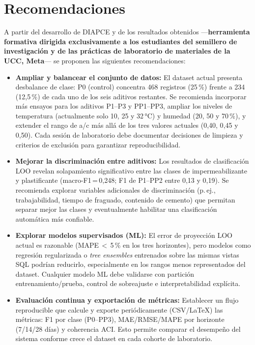 \section{Recomendaciones}

A partir del desarrollo de DIAPCE y de los resultados obtenidos —\textbf{herramienta formativa dirigida exclusivamente a los estudiantes del semillero de investigación y de las prácticas de laboratorio de materiales de la UCC, Meta}— se proponen las siguientes recomendaciones:

\begin{itemize}
  \item \textbf{Ampliar y balancear el conjunto de datos:} El dataset actual presenta desbalance de clase: P0 (control) concentra 468 registros (25\,\%) frente a 234 (12{,}5\,\%) de cada uno de los seis aditivos restantes. Se recomienda incorporar más ensayos para los aditivos P1--P3 y PP1--PP3, ampliar los niveles de temperatura (actualmente solo 10, 25 y 32\,°C) y humedad (20, 50 y 70\,\%), y extender el rango de a/c más allá de los tres valores actuales (0{,}40, 0{,}45 y 0{,}50). Cada sesión de laboratorio debe documentar decisiones de limpieza y criterios de exclusión para garantizar reproducibilidad.

  \item \textbf{Mejorar la discriminación entre aditivos:} Los resultados de clasificación LOO revelan solapamiento significativo entre las clases de impermeabilizante y plastificante (macro-F1\,=\,0{,}248; F1 de P1--PP2 entre 0{,}13 y 0{,}19). Se recomienda explorar variables adicionales de discriminación (p.\,ej., trabajabilidad, tiempo de fraguado, contenido de cemento) que permitan separar mejor las clases y eventualmente habilitar una clasificación automática más confiable.

  \item \textbf{Explorar modelos supervisados (ML):} El error de proyección LOO actual es razonable (MAPE\,$<$\,5\,\% en los tres horizontes), pero modelos como regresión regularizada o \textit{tree ensembles} entrenados sobre las mismas vistas SQL podrían reducirlo, especialmente en los rangos menos representados del dataset. Cualquier modelo ML debe validarse con partición entrenamiento/prueba, control de sobreajuste e interpretabilidad explícita.

  \item \textbf{Evaluación continua y exportación de métricas:} Establecer un flujo reproducible que calcule y exporte periódicamente (CSV/\LaTeX) las métricas: F1 por clase (P0--PP3), MAE/RMSE/MAPE por horizonte (7/14/28 días) y coherencia ACI. Esto permite comparar el desempeño del sistema conforme crece el dataset en cada cohorte de laboratorio.


\end{itemize}
